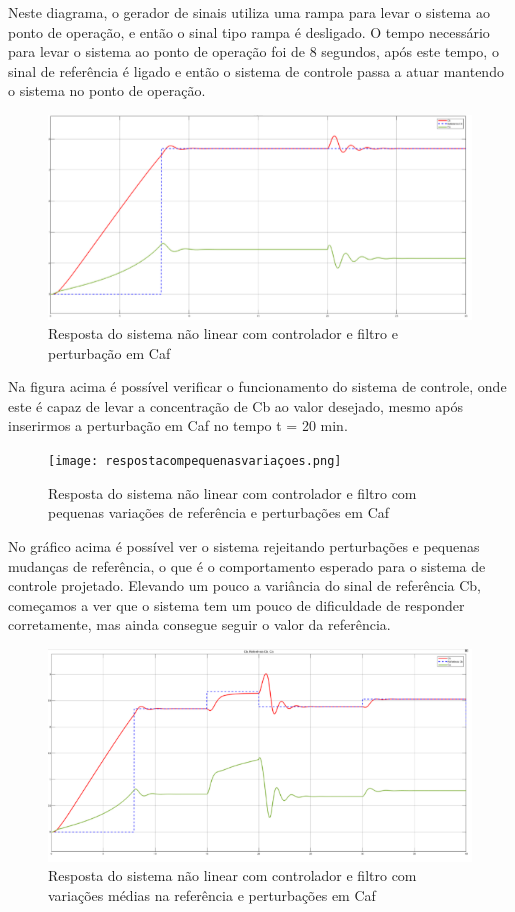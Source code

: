 \documentclass[a4paper,12pt]{report}
\begin{document}
Neste diagrama, o gerador de sinais utiliza uma rampa para levar o sistema ao ponto de operação, e então o sinal tipo rampa é desligado. O tempo necessário para levar o sistema ao ponto de operação foi de 8 segundos, após este tempo, o sinal de referência é ligado e então o sistema de controle passa a atuar mantendo o sistema no ponto de operação. 

\begin{figure}[H]
    \centering
    \includegraphics[width=0.8\linewidth]{naolinear.png}
    \caption{Resposta do sistema não linear com controlador e filtro e perturbação em Caf}
    \label{fig:enter-label}
\end{figure}

Na figura acima é possível verificar o funcionamento do sistema de controle, onde este é capaz de levar a concentração de Cb ao valor desejado, mesmo após inserirmos a perturbação em Caf no tempo t = 20 min. 

\begin{figure}[H]
    \centering
    \texttt{[image: respostacompequenasvariaçoes.png]}
    \caption{Resposta do sistema não linear com controlador e filtro com pequenas variações de referência e perturbações em Caf}
    \label{fig:enter-label}
\end{figure}

No gráfico acima é possível ver o sistema rejeitando perturbações e pequenas mudanças de referência, o que é o comportamento esperado para o sistema de controle projetado.
 Elevando um pouco a variância do sinal de referência Cb, começamos a ver que o sistema tem um pouco de dificuldade de responder corretamente, mas ainda consegue seguir o valor da referência.
 
\begin{figure}[H]
    \centering
    \includegraphics[width=0.8\linewidth]{respostacomcontrolador.png}
    \caption{Resposta do sistema não linear com controlador e filtro com variações médias na referência e perturbações em Caf}
    \label{fig:enter-label}
\end{figure}
\end{document}
